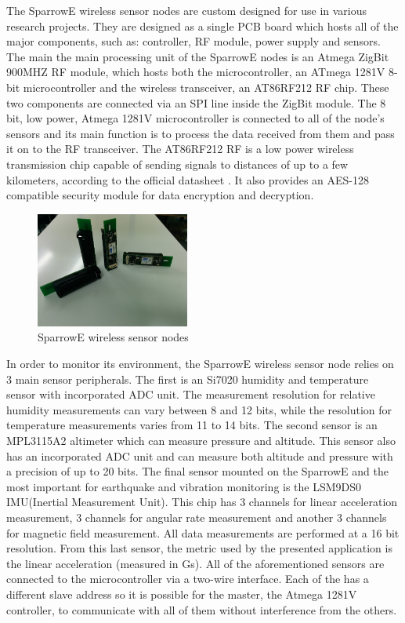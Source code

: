 
The SparrowE wireless sensor nodes are custom designed for use in various research projects.
They are designed as a single PCB board which hosts all of the major components, such as: controller,
RF module, power supply and sensors. The main the main processing unit of the SparrowE nodes is an Atmega 
ZigBit 900MHZ RF module, which hosts both the microcontroller, an ATmega 1281V 8-bit microcontroller and the 
wireless transceiver, an AT86RF212 RF chip. These two components are connected via an SPI line inside the ZigBit 
module. The 8 bit, low power, Atmega 1281V microcontroller is connected to all of the node's sensors and its 
main function is to process the data received from them and pass it on to the RF transceiver. The AT86RF212 RF 
is a low power wireless transmission chip capable of sending signals to distances of up to a few kilometers, according 
to the official datasheet \cite{datasheetatmel}. It also provides an AES-128 compatible security module for data 
encryption and decryption.

\begin{figure}[ht] \centering
  \includegraphics[width=0.45\textwidth]{img/sparrow-nodes.jpg}
  \caption{SparrowE wireless sensor nodes}
\end{figure}

In order to monitor its environment, the SparrowE wireless sensor node relies on 3 main sensor peripherals. The first is 
an Si7020 humidity and temperature sensor with incorporated ADC unit. The measurement resolution for relative humidity measurements
can vary between 8 and 12 bits, while the resolution for temperature measurements varies from 11 to 14 bits. The second sensor is 
an MPL3115A2 altimeter which can measure pressure and altitude. This sensor also has an incorporated ADC unit and can measure 
both altitude and pressure with a precision of up to 20 bits. The final sensor mounted on the SparrowE and the most important for 
earthquake and vibration monitoring is the LSM9DS0 IMU(Inertial Measurement Unit). This chip has 3 channels for linear acceleration measurement, 
3 channels for angular rate measurement and another 3 channels for magnetic field measurement. All data measurements are performed at a 
16 bit resolution. From this last sensor, the metric used by the presented application is the linear acceleration (measured in Gs).
All of the aforementioned sensors are connected to the microcontroller via a two-wire interface. Each of the has a different slave address so 
it is possible for the master, the Atmega 1281V controller, to communicate with all of them without interference from the others.

